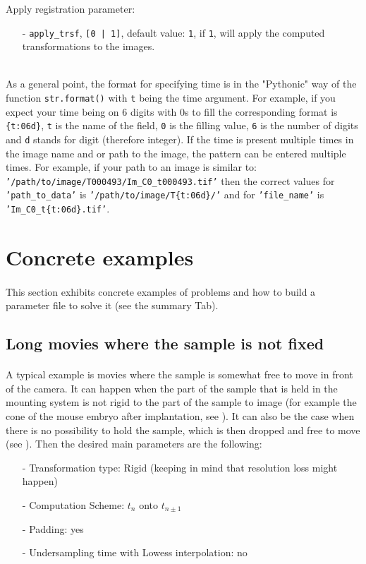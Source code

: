 \documentclass[10pt,a4paper]{article}
\newcommand{\option}[1]{{\texttt{'#1'}}}
\begin{document}
Apply registration parameter:
\begin{itemize}
\item[-] \texttt{apply\_trsf}, \texttt{[0 | 1]}, default value: \texttt{1}, if \texttt{1}, will apply the computed transformations to the images.
\end{itemize}~\\
As a general point, the format for specifying time is in the "Pythonic" way of the function \texttt{str.format()} with \texttt{t} being the time argument. For example, if you expect your time being on 6 digits with 0s to fill the corresponding format is \texttt{\{t:06d\}}, \texttt{t} is the name of the field, \texttt{0} is the filling value, \texttt{6} is the number of digits and \texttt{d} stands for digit (therefore integer). If the time is present multiple times in the image name and or path to the image, the pattern can be entered multiple times. For example, if your path to an image is similar to: \option{/path/to/image/T000493/Im\_C0\_t000493.tif} then the correct values for \option{path\_to\_data} is \option{/path/to/image/T\{t:06d\}/} and for \option{file\_name} is \option{Im\_C0\_t\{t:06d\}.tif}.
\section{Concrete examples}
\paragraph{}This section exhibits concrete examples of problems and how to build a parameter file to solve it (see the summary Tab).
\subsection{Long movies where the sample is not fixed}
\paragraph{}A typical example is movies where the sample is somewhat free to move in front of the camera. It can happen when the part of the sample that is held in the mounting system is not rigid to the part of the sample to image (for example the cone of the mouse embryo after implantation, see \citep{McDole:2018aa}). It can also be the case when there is no possibility to hold the sample, which is then dropped and free to move (see \citep{Guignard:2017aa}). Then the desired main parameters are the following:
	\begin{itemize}
		\item[-] Transformation type: Rigid (keeping in mind that resolution loss might happen)
		\item[-] Computation Scheme: $t_n$ onto $t_{n\pm 1}$
		\item[-] Padding: yes
		\item[-] Undersampling time with Lowess interpolation: no
	\end{itemize}
\end{document}
